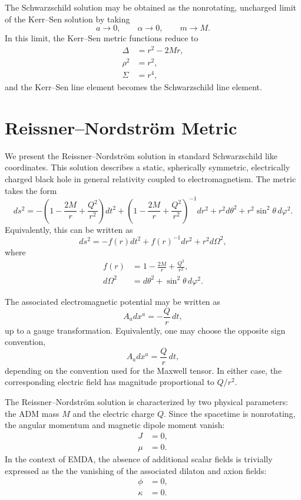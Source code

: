 The Schwarzschild solution may be obtained as the nonrotating, uncharged limit of the Kerr--Sen solution by taking
\begin{equation}
a \to 0,
\qquad
\alpha \to 0,
\qquad
m \to M .
\end{equation}
In this limit, the Kerr--Sen metric functions reduce to
\begin{align}
\Delta &= r^2 - 2Mr, \\
\rho^2 &= r^2, \\
\Sigma &= r^4,
\end{align}
and the Kerr--Sen line element becomes the Schwarzschild line element.

\section{Reissner--Nordstr\"om Metric}
\label{sec:appx:ReissnerNordstromBH}

We present the Reissner--Nordstr\"om solution in standard Schwarzschild like coordinates. This solution describes a static, spherically symmetric, electrically charged black hole in general relativity coupled to electromagnetism. The metric takes the form
\begin{equation}
ds^2 =
-\left(1-\frac{2M}{r}+\frac{Q^2}{r^2}\right)dt^2
+\left(1-\frac{2M}{r}+\frac{Q^2}{r^2}\right)^{-1}dr^2
+r^2 d\theta^2
+r^2\sin^2\theta\, d\varphi^2 .
\end{equation}
Equivalently, this can be written as
\begin{equation}
ds^2 =
-f(r)dt^2
+f(r)^{-1}dr^2
+r^2 d\Omega^2 ,
\end{equation}
where
\begin{align}
f(r) &= 1-\frac{2M}{r}+\frac{Q^2}{r^2}, \\
d\Omega^2 &= d\theta^2+\sin^2\theta\,d\varphi^2 .
\end{align}

The associated electromagnetic potential may be written as
\begin{equation}
A_a dx^a = -\frac{Q}{r}\,dt ,
\end{equation}
up to a gauge transformation. Equivalently, one may choose the opposite sign convention,
\begin{equation}
A_a dx^a = \frac{Q}{r}\,dt ,
\end{equation}
depending on the convention used for the Maxwell tensor. In either case, the corresponding electric field has magnitude proportional to \(Q/r^2\).

The Reissner--Nordstr\"om solution is characterized by two physical parameters: the ADM mass \(M\) and the electric charge \(Q\). Since the spacetime is nonrotating, the angular momentum and magnetic dipole moment vanish:
\begin{align}
J &= 0, \\
\mu &= 0 .
\end{align}
In the context of EMDA, the absence of additional scalar fields is trivially expressed as the the vanishing of the associated dilaton and axion fields: 
\begin{align}
\phi &= 0, \\
\kappa &= 0 .
\end{align}

